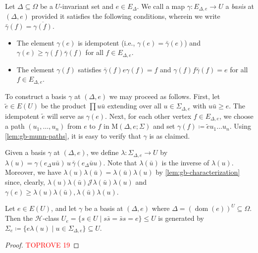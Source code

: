 \documentclass[anonymous,letter,UKenglish,cleveref,autoref,thm-restate]{lipics-v2021}
\renewcommand{\geq}{\geqslant}
\renewcommand{\leq}{\leqslant}
\renewcommand{\ge}{\geq}
\newcommand{\sse}{\subseteq}
\newcommand{\dom}{\operatorname{dom}}
\newcommand*{\gH}[1][]{\mathrel{\mathcal{H}_{#1}}}
\newcommand*{\gJ}[1][]{\mathrel{\mathcal{J}_{#1}}}
\theoremstyle{plain}
\theoremstyle{plain}
\begin{document}
\begin{definition}
  Let $\Delta \sse \Omega$ be a $U$-invariant set and $e \in E_\Delta$.
  We call a map $\gamma \colon E_{\Delta, e} \to U$ a \emph{basis} at $(\Delta, e)$ provided it satisfies the following conditions, wherein we write $\bar\gamma(f) = \overline{\gamma(f)}$.
  \begin{itemize}
    \item The element $\gamma(e)$ is idempotent (i.e., $\gamma(e) = \bar\gamma(e)$) and $\gamma(e) \geq \gamma(f)\bar\gamma(f)$ for all $f \in E_{\Delta, e}$.
    \item The element $\gamma(f)$ satisfies $\bar\gamma(f) e \gamma(f) = f$ and $\gamma(f) f \bar\gamma(f) = e$ for all $f \in E_{\Delta, e}$.
  \end{itemize}
\end{definition}

To construct a basis $\gamma$ at $(\Delta, e)$ we may proceed as follows.
First, let $\tilde e \in E(U)$ be the product $\prod u \bar u$ extending over all $u \in \Sigma_{\Delta,e}$ with $u \bar u \ge e$.
The idempotent $\tilde e$ will serve as $\gamma(e)$.
Next, for each other vertex $f \in E_{\Delta, e}$, we choose a path $(u_1, \dotsc, u_n)$ from $e$ to $f$ in $\mathrm{M}(\Delta, e; \Sigma)$ and set $\gamma(f) \coloneqq \tilde e u_1 \dotsc u_n$.
Using \cref{lem:gb-munn-paths}, it is easy to verify that $\gamma$ is as claimed.

Given a basis $\gamma$ at $(\Delta, e)$, we define $\lambda\colon \Sigma_{\Delta,e} \to U$ by $\lambda(u) = \gamma(e_\Delta u \bar u) \, u \, \bar\gamma(e_\Delta \bar u u)$.
Note that $\lambda(\bar u)$ is the inverse of $\lambda(u)$.
Moreover, we have $\lambda(u)\lambda(\bar u) = \lambda(\bar u )\lambda(u)$ by \cref{lem:gb-characterization} since, clearly, $\lambda(u)\lambda(\bar u) \gJ \lambda(\bar u )\lambda(u)$ and $\gamma(e) \geq \lambda(u)\lambda(\bar u), \lambda(\bar u )\lambda(u)$.

\begin{lemma}\label{lem:gb-munn-hclass}
  Let $e \in E(U)$, and let $\gamma$ be a basis at $(\Delta, e)$ where $\Delta = (\dom(e))^U \sse \Omega$.
  Then the $\gH$-class $U_e = \{s \in U \mid s\bar s = \bar s s = e\} \leq U$ is generated by $\Sigma_e \coloneqq \{ e \lambda(u) \mid u \in \Sigma_{\Delta, e}\} \sse U$.
\end{lemma}

\begin{proof}\textcolor{red}{TOPROVE 19}\end{proof}
\end{document}
